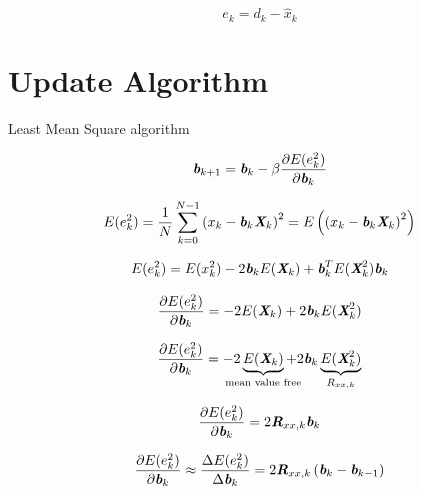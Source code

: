 \documentclass[
    10pt, %
    DIV12,
    english, %
    a5paper, %
    twoside, %
    titlepage, %
    parskip=half, %
    headings=small, %
    listof=totoc, %
    bibliography=totoc, %
    index=totoc, %
    captions=tableheading, %
    final %
]{scrbook}
\begin{document}
\begin{equation}\label{error}
e_k=d_k-\hat{x}_k
\end{equation}

\section{Update Algorithm}

Least Mean Square algorithm

\begin{equation}
\textit{\textbf{b}}_{k+1}=\textit{\textbf{b}}_k-\beta \frac{\partial E(e_k^2)}{\partial \textit{\textbf{b}}_k}\nonumber
\end{equation}

\begin{equation}
E(e_k^2) = \frac{1}{N}\sum_{k=0}^{N-1}\left(x_k-\textit{\textbf{b}}_k\textit{\textbf{X}}_k\right)^2=E\left(\left(x_k-\textit{\textbf{b}}_k\textit{\textbf{X}}_k\right)^2\right) \nonumber
\end{equation}

\begin{equation}
E(e_k^2) = E(x_k^2)-2\textit{\textbf{b}}_k E(\textit{\textbf{X}}_k)+\textit{\textbf{b}}_k^T E(\textit{\textbf{X}}_k^2)\textit{\textbf{b}}_k\nonumber
\end{equation}

\begin{equation}
\frac{\partial E(e_k^2) }{\partial \textit{\textbf{b}}_k}= -2 E(\textit{\textbf{X}}_k)+2 \textit{\textbf{b}}_k E(\textit{\textbf{X}}_k^2)\nonumber
\end{equation}

\begin{equation}
\frac{\partial E(e_k^2) }{\partial \textit{\textbf{b}}_k}= -2 \underbrace{E(\textit{\textbf{X}}_k)}_\text{\clap{mean value free}}+2 \textit{\textbf{b}}_k \underbrace{E(\textit{\textbf{X}}_k^2)}_\text{\clap{$R_{xx,k}$}}\nonumber
\end{equation}

\begin{equation}
\frac{\partial E(e_k^2)}{\partial \textit{\textbf{b}}_k}=2\textit{\textbf{R}}_{xx,k}\textit{\textbf{b}}_k\nonumber
\end{equation}

\begin{equation}
\frac{\partial E(e_k^2)}{\partial \textit{\textbf{b}}_k} \approx \frac{\Delta E(e_k^2)}{\Delta \textit{\textbf{b}}_k}=2\textit{\textbf{R}}_{xx,k}\left(\textit{\textbf{b}}_k-\textit{\textbf{b}}_{k-1}\right)\nonumber
\end{equation}
\end{document}
